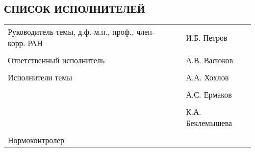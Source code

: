 \begin{center}\section*{СПИСОК ИСПОЛНИТЕЛЕЙ}\end{center}

\begin{table*}[ht]
\centering
\begin{tabular}{b{7cm} b{4cm} b{6cm}}
Руководитель темы, д.ф.-м.н., проф., член-корр. РАН & \hrulefill & И.Б. Петров \\
 & & \\
Ответственный исполнитель & \hrulefill & А.В. Васюков \\
 & & \\
Исполнители темы & \hrulefill & А.А. Хохлов \\
 & & \\
 & \hrulefill & А.С. Ермаков \\
 & & \\
 & \hrulefill & К.А. Беклемышева \\
 & & \\
Нормоконтролер & \hrulefill &  \\
\end{tabular}
\end{table*}
